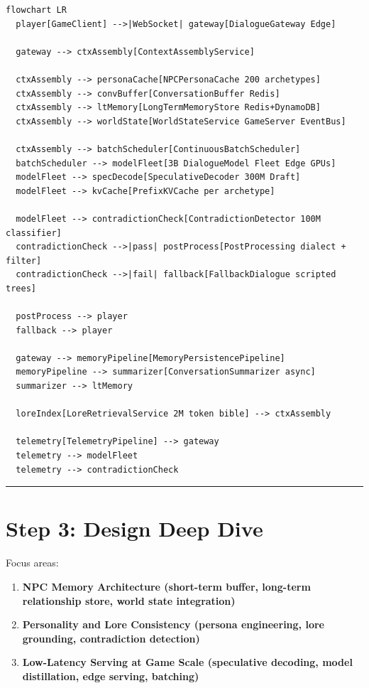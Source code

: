 \begin{verbatim}
flowchart LR
  player[GameClient] -->|WebSocket| gateway[DialogueGateway Edge]

  gateway --> ctxAssembly[ContextAssemblyService]

  ctxAssembly --> personaCache[NPCPersonaCache 200 archetypes]
  ctxAssembly --> convBuffer[ConversationBuffer Redis]
  ctxAssembly --> ltMemory[LongTermMemoryStore Redis+DynamoDB]
  ctxAssembly --> worldState[WorldStateService GameServer EventBus]

  ctxAssembly --> batchScheduler[ContinuousBatchScheduler]
  batchScheduler --> modelFleet[3B DialogueModel Fleet Edge GPUs]
  modelFleet --> specDecode[SpeculativeDecoder 300M Draft]
  modelFleet --> kvCache[PrefixKVCache per archetype]

  modelFleet --> contradictionCheck[ContradictionDetector 100M classifier]
  contradictionCheck -->|pass| postProcess[PostProcessing dialect + filter]
  contradictionCheck -->|fail| fallback[FallbackDialogue scripted trees]

  postProcess --> player
  fallback --> player

  gateway --> memoryPipeline[MemoryPersistencePipeline]
  memoryPipeline --> summarizer[ConversationSummarizer async]
  summarizer --> ltMemory

  loreIndex[LoreRetrievalService 2M token bible] --> ctxAssembly

  telemetry[TelemetryPipeline] --> gateway
  telemetry --> modelFleet
  telemetry --> contradictionCheck
\end{verbatim}

\bigskip\hrule\bigskip

\section*{Step 3: Design Deep Dive}

Focus areas:
\begin{enumerate}
  \item \textbf{NPC Memory Architecture (short-term buffer, long-term relationship store, world state integration)}
  \item \textbf{Personality and Lore Consistency (persona engineering, lore grounding, contradiction detection)}
  \item \textbf{Low-Latency Serving at Game Scale (speculative decoding, model distillation, edge serving, batching)}
\end{enumerate}

